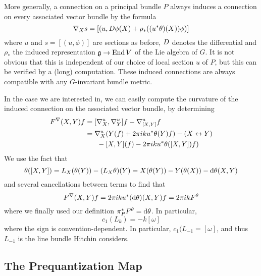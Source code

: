 \documentclass[parskip=half]{scrartcl}
\begin{document}
\begin{rem}\leavevmode
	\begin{numberedlist}
		\item More generally, a connection on a principal bundle $P$ always induces a connection on every associated vector bundle by the formula 
		\begin{equation*}
			\nabla_X s=[(u,D \phi(X)+\rho_*((u^*\theta)(X)) \phi)]
		\end{equation*}
		where $u$ and $s=[(u,\phi)]$ are sections as before, $D$ denotes the differential and $\rho_*$ the induced representation $\mathfrak{g}\to \operatorname{End} V$ of the Lie algebra of $G$. It is not obvious that this is independent of our choice of local section $u$ of $P$, but this can be verified by a (long) computation. These induced connections are always compatible with any $G$-invariant bundle metric.
		\item In the case we are interested in, we can easily compute the curvature of the induced connection on the associated vector bundle, by determining
		\begin{align*}
			F^\nabla(X,Y) f&=[\nabla^u_X,\nabla^u_Y] f -\nabla^u_{[X,Y]}f\\
			&=\nabla^u_X(Y(f)+2\pi i k u^*\theta(Y)f) - (X\leftrightarrow Y)\\
			&\hspace{0.6cm}-[X,Y](f)-2\pi i k u^*\theta([X,Y])f)		
		\end{align*}
		We use the fact that 
		\begin{equation*}
			\theta([X,Y])=L_X(\theta(Y))-(L_X\theta)(Y)=X(\theta(Y))-Y(\theta(X))-\mathrm{d} \theta(X,Y)
		\end{equation*}
		and several cancellations between terms to find that 
		\begin{equation*}
			F^\nabla(X,Y)f=2\pi i k u^*(\mathrm{d} \theta)(X,Y)f=2\pi i k F^\theta
		\end{equation*}
		where we finally used our definition $\pi_P^*F^\theta=\mathrm{d}\theta$. In particular, 
		\begin{equation*}
			c_1(L_k)=-k[\omega]
		\end{equation*}
		where the sign is convention-dependent. In particular, $c_1(L_{-1}=[\omega]$, and thus $L_{-1}$ is the line bundle Hitchin considers.
	\end{numberedlist}
\end{rem}

\subsection{The Prequantization Map}
\end{document}
